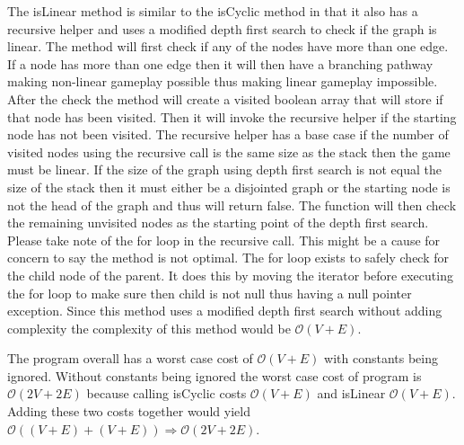 \documentclass[11pt]{article}
\begin{document}
The isLinear method is similar to the isCyclic method in that it also has a recursive helper and uses a modified depth first search to check if the graph is linear. The method will first check if any of the nodes have more than one edge. If a node has more than one edge then it will then have a branching pathway making non-linear gameplay possible thus making linear gameplay impossible. After the check the method will create a visited boolean array that will store if that node has been visited. Then it will invoke the recursive helper if the starting node has not been visited. The recursive helper has a base case if the number of visited nodes using the recursive call is the same size as the stack then the game must be linear. If the size of the graph using depth first search is not equal the size of the stack then it must either be a disjointed graph or the starting node is not the head of the graph and thus will return false. The function will then check the remaining unvisited nodes as the starting point of the depth first search. Please take note of the for loop in the recursive call. This might be a cause for concern to say the method is not optimal. The for loop exists to safely check for the child node of the parent. It does this by moving the iterator before executing the for loop to make sure then child is not null thus having a null pointer exception. Since this method uses a modified depth first search without adding complexity the complexity of this method would be $\mathcal{O}(V+E)$.

The program overall has a worst case cost of $\mathcal{O}(V + E)$ with constants being ignored. Without constants being ignored the worst case cost of program is $\mathcal{O}(2V+2E)$ because calling isCyclic costs $\mathcal{O}(V+E)$ and isLinear $\mathcal{O}(V+E)$. Adding these two costs together would yield $\mathcal{O}((V+E) + (V+E)) \Rightarrow \mathcal{O}(2V+2E)$.
\end{document}
